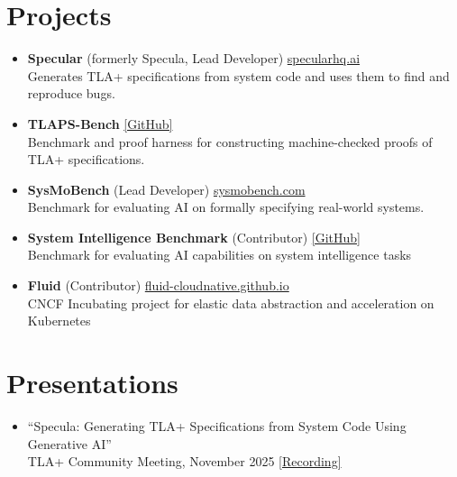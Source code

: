 \documentclass[11pt,a4paper]{article}
\begin{document}
\section{Projects}

\begin{itemize}[leftmargin=*, nosep, topsep=2pt]
    \item \textbf{Specular} (formerly Specula, Lead Developer) \hfill \href{https://specularhq.ai/}{specularhq.ai}\\
    Generates TLA+ specifications from system code and uses them to find and reproduce bugs.

    \item \textbf{TLAPS-Bench} \hfill \href{https://github.com/specular-org/TLAPS-Bench}{[GitHub]}\\
    Benchmark and proof harness for constructing machine-checked proofs of TLA+ specifications.

    \item \textbf{SysMoBench} (Lead Developer) \hfill \href{https://sysmobench.com/}{sysmobench.com}\\
    Benchmark for evaluating AI on formally specifying real-world systems.

    \item \textbf{System Intelligence Benchmark} (Contributor) \hfill \href{https://github.com/sys-intelligence/system-intelligence-benchmark}{[GitHub]}\\
    Benchmark for evaluating AI capabilities on system intelligence tasks

    \item \textbf{Fluid} (Contributor) \hfill \href{https://fluid-cloudnative.github.io}{fluid-cloudnative.github.io}\\
    CNCF Incubating project for elastic data abstraction and acceleration on Kubernetes
\end{itemize}

\section{Presentations}

\begin{itemize}[leftmargin=*, nosep, topsep=2pt]
    \item ``Specula: Generating TLA+ Specifications from System Code Using Generative AI''\\
    TLA+ Community Meeting, November 2025 \hfill \href{https://www.youtube.com/watch?v=BoIjXJXN3GU&t=771s}{[Recording]}
\end{itemize}
\end{document}
